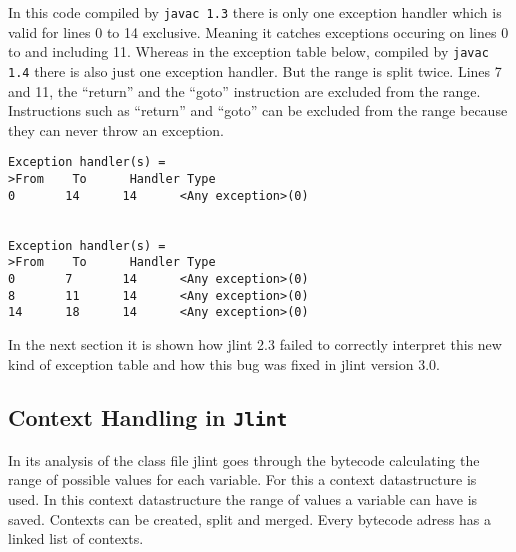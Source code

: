 \documentclass[11pt,twoside,a4paper,draft]{article}
\begin{document}
In this code compiled by \texttt{javac 1.3} there is only one exception handler
which is valid for lines 0 to 14 exclusive. Meaning it catches
exceptions occuring on lines 0 to and including 11. Whereas in the
exception table below, compiled by \texttt{javac 1.4} there is also
just one exception handler. But the range is split twice.
Lines 7 and 11, the ``return'' and the ``goto'' instruction
are excluded from the range. 
Instructions such as ``return'' and ``goto'' can be excluded from the range
because they can never throw an exception.


\begin{verbatim}
Exception handler(s) =
>From    To      Handler Type
0       14      14      <Any exception>(0)


Exception handler(s) =
>From    To      Handler Type
0       7       14      <Any exception>(0)
8       11      14      <Any exception>(0)
14      18      14      <Any exception>(0)

\end{verbatim}

In the next section it is shown how jlint 2.3 
failed to correctly interpret this new kind of exception table and how this
bug was fixed in jlint version 3.0. 


\subsection {Context Handling in \texttt{Jlint}}

In its analysis of the class file jlint goes through the bytecode calculating
the range of possible values for each variable. For this a context 
datastructure is used. In this context datastructure the range of 
values a variable  can have is saved. Contexts can be created, split and 
merged. Every bytecode adress has a linked list of contexts.
\end{document}

